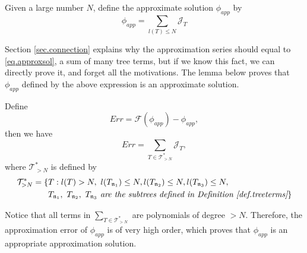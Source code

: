 \begin{defn}
Given a large number $N$, define the approximate solution $\phi_{app}$ by
\begin{equation}\label{eq.approxsol}
 \phi_{app}=\sum_{l(T)\le N} \mathcal{J}_T
\end{equation}
\end{defn}

Section \ref{sec.connection} explains why the approximation series should equal to \eqref{eq.approxsol}, a sum of many tree terms, but if we know this fact, we can directly prove it, and forget all the motivations. The lemma below proves that $\phi_{app}$ defined by the above expression is an approximate solution. 

\begin{lem}\label{lem.approxerror} Define 
\begin{equation}
 Err=\mathcal{F}(\phi_{app})-\phi_{app},
\end{equation}
then we have 
\begin{equation}\label{eq.approxerror}
 Err=\sum_{T\in \mathcal{T}_{>N}^*} \mathcal{J}_T,
\end{equation}
where $\mathcal{T}_{>N}^*$ is defined by
\begin{equation}
\begin{split}
 \mathcal{T}_{>N}^*=\{&T:l(T)>N,\ l(T_{\mathfrak{n}_1})\le N,
 l(T_{\mathfrak{n}_2})\le N,
 l(T_{\mathfrak{n}_3})\le N,
 \\
 &T_{\mathfrak{n}_1},\ T_{\mathfrak{n}_2},\ T_{\mathfrak{n}_3}\textit{ are the subtrees defined in Definition \ref{def.treeterms}} \}
\end{split}
\end{equation}
\end{lem}

\begin{rem}
Notice that all terms in $\sum_{T\in \mathcal{T}_{>N}^*}$ are polynomials of degree $>N$. Therefore, the approximation error of $\phi_{app}$ is of very high order, which proves that $\phi_{app}$ is an appropriate approximation solution. 
\end{rem}

